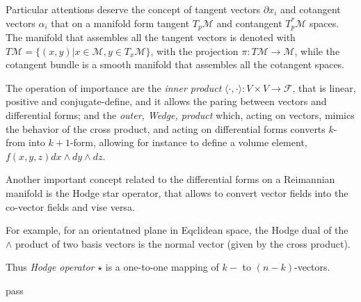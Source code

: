 {    Particular attentions deserve the concept of tangent vectors $\partial x_i$ and cotangent vectors $\alpha_i$ that on a manifold form tangent $T_p \mathcal{M}$ and contangent $T_p^*\mathcal{M}$ spaces. The manifold that assembles all the tangent vectors is denoted with $T\mathcal{M} = \{ (x,y) | x\in \mathcal{M}, y \in T_x \mathcal{M} \}$, with the projection $\pi:T\mathcal{M}\rightarrow \mathcal{M}$, while the cotangent bundle is a smooth manifold that assembles all the cotangent spaces.
    
    The operation of importance are the \textit{inner product} $\langle \cdot,\cdot \rangle : V \times V \rightarrow \mathcal{F}$, that is linear, positive and conjugate-define, and it allows the paring between vectors and differential forms; 
    and the \textit{outer, Wedge, product} which, acting on vectors, mimics the behavior of the cross product, and acting on differential forms converts $k$-from into $k+1$-form, allowing for instance to define a volume element, $f(x,y,z)dx \wedge dy \wedge dz$. 
    
    Another important concept related to the differential forms on a Reimannian manifold is the Hodge star operator, that allows to convert vector fields into the co-vector fields and vise versa.
    
    For example, for an orientatned plane in Eqclidean space,
    the Hodge dual of the $\wedge$ product of two basis vectors is the normal vector (given by the cross product).
    
    Thus \textit{Hodge operator} $\star$ is a one-to-one mapping of $k-$ to $(n-k)$-vectors.
    
}{
    pass
}

